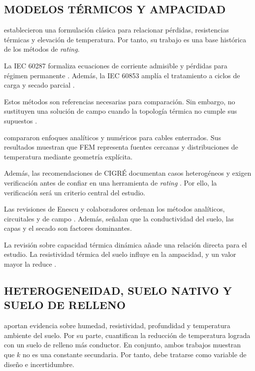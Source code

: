 \documentclass[11pt,a4paper,oneside]{report}
\begin{document}
\subsection{MODELOS TÉRMICOS Y AMPACIDAD}

\textcite[752--772]{neher1957} establecieron una formulación clásica para relacionar pérdidas, resistencias térmicas y elevación de temperatura. Por tanto, su trabajo es una base histórica de los métodos de \textit{rating}.

La IEC 60287 formaliza ecuaciones de corriente admisible y pérdidas para régimen permanente \parencite[cláusulas 4--5]{iec60287}. Además, la IEC 60853 amplía el tratamiento a ciclos de carga y secado parcial \parencite[cláusulas 2--4]{iec60853}.

Estos métodos son referencias necesarias para comparación. Sin embargo, no sustituyen una solución de campo cuando la topología térmica no cumple sus supuestos \parencites{iec60287}{iec60853}[3--4,93--99]{cigre2025}.

\textcite[1387--1400]{aras2005} compararon enfoques analíticos y numéricos para cables enterrados. Sus resultados muestran que FEM representa fuentes cercanas y distribuciones de temperatura mediante geometría explícita.

Además, las recomendaciones de CIGRÉ documentan casos heterogéneos y exigen verificación antes de confiar en una herramienta de \textit{rating} \parencite[3--4,41--42,93--99]{cigre2025}. Por ello, la verificación será un criterio central del estudio.

Las revisiones de Enescu y colaboradores ordenan los métodos analíticos, circuitales y de campo \parencite[4,11,17]{enescu2020}. Además, señalan que la conductividad del suelo, las capas y el secado son factores dominantes.

La revisión sobre capacidad térmica dinámica añade una relación directa para el estudio. La resistividad térmica del suelo influye en la ampacidad, y un valor mayor la reduce \parencite[3--6]{enescu2021}.

\subsection{HETEROGENEIDAD, SUELO NATIVO Y SUELO DE RELLENO}

\textcite[1,6--9]{khumalo2025} aportan evidencia sobre humedad, resistividad, profundidad y temperatura ambiente del suelo. Por su parte, \textcite[1,10,16]{kim2025} cuantifican la reducción de temperatura lograda con un suelo de relleno más conductor. En conjunto, ambos trabajos muestran que $k$ no es una constante secundaria. Por tanto, debe tratarse como variable de diseño e incertidumbre.
\end{document}
